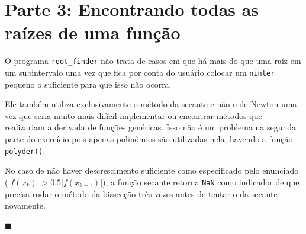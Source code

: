 \documentclass{article}
\begin{document}
\section{Parte 3: Encontrando todas as raízes de uma função}

\qquad
O programa \texttt{root\_finder} não trata de casos em que há mais do que uma raíz em um subintervalo uma vez que fica por conta do usuário colocar um \texttt{ninter} pequeno o suficiente para que isso não ocorra.
 
Ele também utiliza exclusivamente o método da secante e não o de Newton uma vez que seria muito mais difícil implementar ou encontrar métodos que realizariam a derivada de funções genéricas. Isso não é um problema na segunda parte do exercício pois apenas polinômios são utilizadas nela, havendo a função \texttt{polyder()}.

No caso de não haver descrescimento suficiente como especificado pelo enunciado ($|f(x_{k})| > 0.5|f(x_{k-1})|$), a função secante retorna \texttt{NaN} como indicador de que precisa rodar o método da bissecção três vezes antes de tentar o da secante novamente.

\begin{flushright}
$\blacksquare$
\end{flushright}
\end{document}

